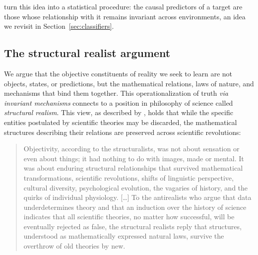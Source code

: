 \citet{peters2016causal} turn this idea into a statistical procedure: the causal predictors of a target are those whose relationship with it remains invariant across environments, an idea we revisit in Section~\ref{sec:classifiers}.

\subsection{The structural realist argument}

We argue that the objective constituents of reality we seek to learn are not objects, states, or predictions, but the mathematical relations, laws of nature, and mechanisms that bind them together. This operationalization of truth \emph{via invariant mechanisms} connects to a position in philosophy of science called \emph{structural realism}. This view, as described by \citet{daston2007}, holds that while the specific entities postulated by scientific theories may be discarded, the mathematical structures describing their relations are preserved across scientific revolutions:
\begin{quote}
Objectivity, according to the structuralists, was not about sensation or even about things; it had nothing to do with images, made or mental. It was about enduring structural relationships that survived mathematical transformations, scientific revolutions, shifts of linguistic perspective, cultural diversity, psychological evolution, the vagaries of history, and the quirks of individual physiology. [\ldots] To the antirealists who argue that data underdetermines theory and that an induction over the history of science indicates that all scientific theories, no matter how successful, will be eventually rejected as false, the structural realists reply that structures, understood as mathematically expressed natural laws, survive the overthrow of old theories by new. \citep[pp. 259--261]{daston2007}
\end{quote}

